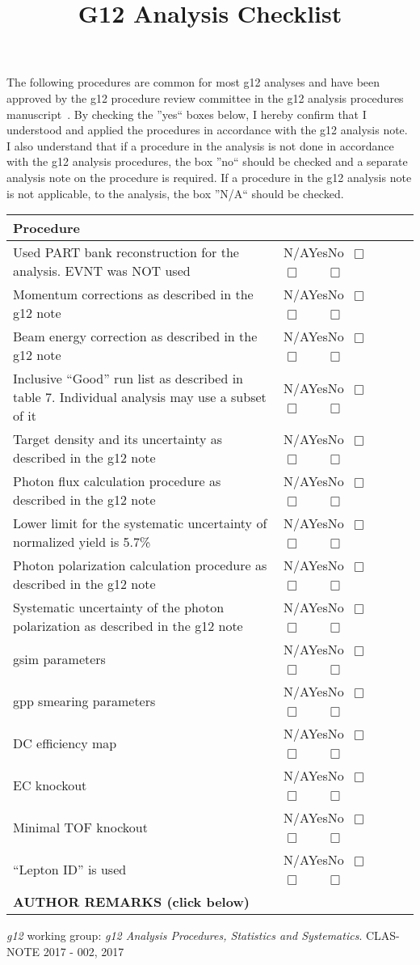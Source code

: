 \documentclass[11pt]{article} %
\title{G12 Analysis Checklist}
\date{\vspace{-10ex}}
\newcommand{\yesno}{\textsf{N/A}\hskip11pt\textsf{Yes}\hskip11pt\textsf{No}\hskip11pt{\Large ~$\Box$}~~~~ {\Large ~$\Box$}~~~~{\Large $\Box$}}
\newcommand{\question}[1]{

		\textsf{#1} &{\small\yesno} \\ \hline%
}
\newcommand{\heading}[1]{%
	\multicolumn{2}{l|}{\bf\textsf{#1}}\\ \hline %
}
\begin{document}
	The following procedures are common for most g12 analyses and have been approved by the g12 procedure review committee in the g12 analysis procedures manuscript~\cite{g12note}.
	By checking the ''yes`` boxes below, I hereby confirm that I understood and applied the procedures in accordance with the g12 analysis note. I also understand that if a procedure in the analysis is not done in accordance with the g12 analysis procedures, the box ''no`` should be checked and a separate analysis note on the procedure is required. If a procedure in the g12 analysis note is not applicable, to the analysis, the box ''N/A`` should be checked. 
	
	\begin{longtable}{|p{6.61cm}|p{3.1cm}|}
		\heading{Procedure}
        \question{Used PART bank reconstruction for the analysis. EVNT was NOT used}
       \question{Momentum corrections as described in the g12 note}
		\question{Beam energy correction as described in the g12 note}
		\question{Inclusive “Good” run list as described in table 7. Individual analysis may use a subset of it}
		\question{Target density and its uncertainty as described in the g12 note}
		\question{Photon flux calculation procedure as described in the g12 note}
		\question{Lower limit for the systematic uncertainty of normalized yield is 5.7\%}
		\question{Photon polarization calculation procedure as described in the g12 note}
		\question{Systematic uncertainty of the photon polarization as described in the g12 note}
		\question{gsim parameters}
		\question{gpp smearing parameters}
		\question{DC efficiency map}
		\question{EC knockout}
		\question{Minimal TOF knockout}
		\question{“Lepton ID” is used}
		\hline%
		\multicolumn{2}{|l|}{\bf {\textsf{AUTHOR REMARKS}} (click below)}\\
	\end{longtable}
	\vspace{-0.75cm}
	\begin{Form}
		\begin{center}
		\centering
			\TextField[name=multilinetextbox, multiline=true, width=\longline,height=4in]{}
		\end{center}
	\end{Form}
		\vspace{0.75cm}
	
	\begin{thebibliography}{9}
		\textit{g12} working group:
		\textit{g12 Analysis Procedures, Statistics and Systematics}. CLAS-NOTE 2017 - 002,
		2017
	\end{thebibliography}
	
	
\end{document}
